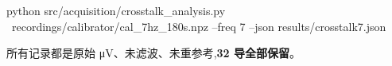 \documentclass[11pt]{ctexart}
\begin{document}
\begin{shell}
python src/acquisition/crosstalk_analysis.py \
    recordings/calibrator/cal_7hz_180s.npz --freq 7 --json results/crosstalk7.json
\end{shell}

所有记录都是原始 \si{\micro\volt}、未滤波、未重参考,\textbf{32 导全部保留}。
\end{document}
